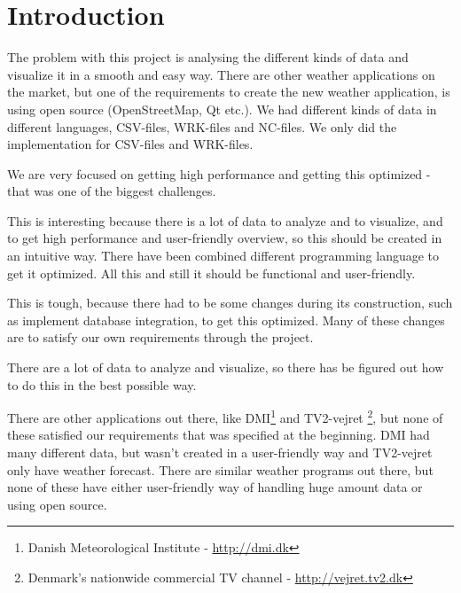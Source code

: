 \chapter{Introduction}
\label{sec:introduction}



The problem with this project is analysing the different kinds of data and visualize it in a smooth and easy way. There are other weather applications on the market, but one of the requirements to create the new weather application, is using open source (OpenStreetMap, Qt etc.). We had different kinds of data in different languages, CSV-files, WRK-files and NC-files. We only did the implementation for CSV-files and WRK-files.

We are very focused on getting high performance and getting this optimized - that was one of the biggest challenges.

This is interesting because there is a lot of data to analyze and to visualize, and to get high performance and user-friendly overview, so this should be created in an intuitive way. There have been combined different programming language to get it optimized. All this and still it should be functional and user-friendly.

This is tough, because there had to be some changes during its construction, such as implement database integration, to get this optimized. Many of these changes are to satisfy our own requirements through the project.

There are a lot of data to analyze and visualize, so there has be figured out how to do this in the best possible way.

There are other applications out there, like DMI\footnote{Danish Meteorological Institute - \url{http://dmi.dk}} and TV2-vejret \footnote{Denmark's nationwide commercial TV channel - \url{http://vejret.tv2.dk}}, but none of these satisfied our requirements that was specified at the beginning. DMI had many different data, but wasn't created in a user-friendly way and TV2-vejret only have weather forecast. There are similar weather programs out there, but none of these have either user-friendly way of handling huge amount data or using open source.

